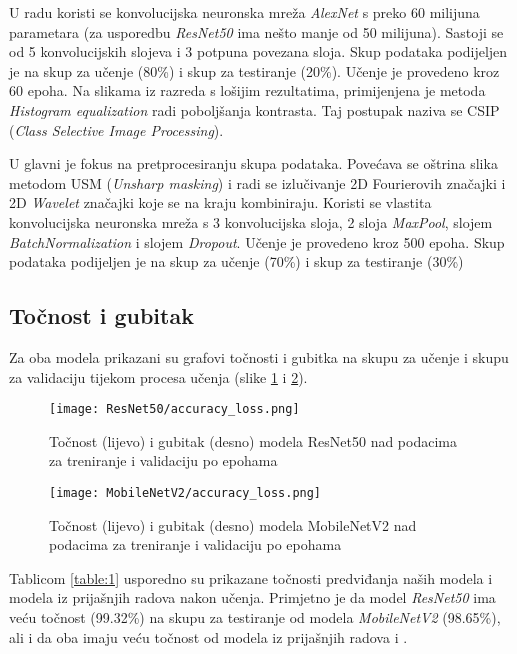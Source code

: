 \documentclass[conference, utf8]{IEEEtran}
\begin{document}
	U radu \cite{RAD1} koristi se konvolucijska neuronska mreža \textit{AlexNet} s preko 60 milijuna parametara (za usporedbu \textit{ResNet50} ima nešto manje od 50 milijuna). Sastoji se od 5 konvolucijskih slojeva i 3 potpuna povezana sloja. Skup podataka podijeljen je na skup za učenje (80\%) i skup za testiranje (20\%). Učenje je provedeno kroz 60 epoha. Na slikama iz razreda s lošijim rezultatima, primijenjena je metoda \textit{Histogram equalization} radi poboljšanja kontrasta. Taj postupak naziva se CSIP (\textit{Class Selective Image Processing}).
	
	U \cite{RAD2} glavni je fokus na pretprocesiranju skupa podataka. Povećava se oštrina slika metodom USM (\textit{Unsharp masking}) i radi se izlučivanje 2D Fourierovih značajki i 2D \textit{Wavelet} značajki koje se na kraju kombiniraju. Koristi se vlastita konvolucijska neuronska mreža s 3 konvolucijska sloja, 2 sloja \textit{MaxPool}, slojem \textit{BatchNormalization} i slojem \textit{Dropout}. Učenje je provedeno kroz 500 epoha. Skup podataka podijeljen je na skup za učenje (70\%) i skup za testiranje (30\%)
	
	\subsection{Točnost i gubitak}
	Za oba modela prikazani su grafovi točnosti i gubitka na skupu za učenje i skupu za validaciju tijekom procesa učenja (slike \ref{fig:RN50_acc_loss} i \ref{fig:MN_acc_loss}). 
	\begin{figure}[H]
		\centering
		\texttt{[image: ResNet50/accuracy\_loss.png]}
		\caption{Točnost (lijevo) i gubitak (desno) modela ResNet50 nad podacima za treniranje i validaciju po epohama}
		\label{fig:RN50_acc_loss}
	\end{figure}
	\begin{figure}[H]
		\centering
		\texttt{[image: MobileNetV2/accuracy\_loss.png]}
		\caption{Točnost (lijevo) i gubitak (desno) modela MobileNetV2 nad podacima za treniranje i validaciju po epohama}
		\label{fig:MN_acc_loss}
	\end{figure}
	
	Tablicom \ref{table:1} usporedno su prikazane točnosti predviđanja naših modela i modela iz prijašnjih radova nakon učenja. 	
	Primjetno je da model \textit{ResNet50} ima veću točnost (99.32\%) na skupu za testiranje od modela \textit{MobileNetV2} (98.65\%), ali i da oba imaju veću točnost od modela iz prijašnjih radova \cite{RAD1} i \cite{RAD2}.
	
\end{document}
